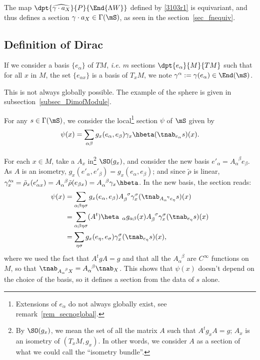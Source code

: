 The map $\dpt{\widehat{\gamma\cdot a_X}}{P}{\End{\Lambda W }}$ defined by \eqref{3103r1} is equivariant, and thus defines a section
$\gamma\cdot a_X\in\Gamma(\mS)$, as seen in the section~\ref{sec_fnequiv}.

\subsection{Definition of Dirac}

If we consider a basis $\{e_{\alpha}\}$ of $TM$, \emph{i.e.} $m$ sections $\dpt{e_{\alpha}}{M}{TM}$ such that for all $x$ in $M$, the set $\{e_{\alpha x}\}$ is a basis of $T_xM$, we note $\gamma^{\alpha}:=\gamma(e_{\alpha})\in\End(\mS)$.

\begin{remark}
	This is not always globally possible. The example of the sphere is given in subsection~\ref{subsec_DimofModule}.
	\label{rem_secnoglobal}
\end{remark}

For any $s\in\Gamma(\mS)$, we consider the local\footnote{Extensions of $e_{\alpha}$ do not always globally exist, see remark~\ref{rem_secnoglobal}.} section $\psi$ of $\mS$ given by
\[
	\psi(x)=
	\sum_{\alpha\beta}g_x(e_{\alpha},e_{\beta})\gamma_x\hbeta(\tnab_{e_{\alpha}}s)(x).
\]

For each $x\in M$, take a $A_x$ in\footnote{By $\SO(g_x)$, we mean the set of all the matrix $A$ such that $A^tg_xA=g$; $A_x$ is an isometry of $(T_xM,g_x)$. In other words, we consider $A$ as a section of what we could call the ``isometry bundle''.} $\SO(g_x)$, and consider the new basis $e'_{\alpha}=A_{\alpha}^{\phantom{\alpha}\beta}e_{\beta}$. As $A$ is an isometry, $g_x(e'_{\alpha},e'_{\beta})=g_x(e_{\alpha},e_{\beta})$; and since $\tilde\rho$ is linear, $\gamma_x'^{\alpha}=\tilde\rho_x(e'_{\alpha x})=A_{\alpha}^{\phantom{\alpha}\beta}\tilde\rho(e_{\beta x})=A_{\alpha}^{\phantom{\alpha}\beta}\gamma_x\hbeta$. In the new basis, the section reads:
\begin{equation}
	\begin{split}
		\psi(x)&=\sum_{\alpha\beta\eta\sigma}g_x(e_{\alpha},e_{\beta})
		A_{\beta}^{\phantom{\beta}\sigma}\gamma_x^{\sigma}
		(\tnab_{A_{\alpha}^{\phantom{\alpha}\eta}e_{\eta}}s)(x)\\
		&=\sum_{\alpha\beta\eta\sigma}(A^t)\heta_{\phantom{\eta}\alpha}
		g_{\alpha\beta}(x)A_{\beta}^{\phantom{\beta}\sigma}
		\gamma_x^{\sigma}(\tnab_{e_{\eta}}s)(x)\\
		&=\sum_{\eta\sigma}g_x(e_{\eta},e_{\sigma})\gamma_x^{\sigma}(\tnab_{e_{\eta}}s)(x),
	\end{split}
\end{equation}
where we used the fact that $A^tgA=g$ and that all the $A_{\alpha}^{\phantom{\alpha}\beta}$ are $C^{\infty}$ functions on $M$, so that
$\tnab_{A_{\alpha}^{\phantom{\alpha}\beta}X}=A_{\alpha}^{\phantom{\alpha}\beta}\tnab_X$.  This shows that $\psi(x)$ doesn't depend on the choice of the basis, so it defines a section from the data of $s$ alone.

